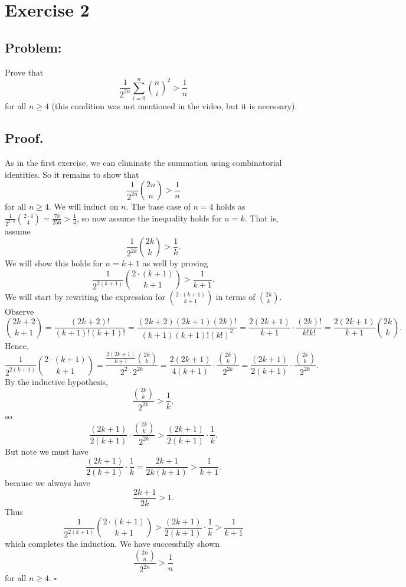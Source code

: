 \documentclass{article}
\begin{document}
\section{Exercise 2}

\subsection{Problem:} Prove that $$\frac{1}{2^{2n}}\sum_{i=0}^{n} \binom{n}{i}^2 >\frac{1}{n}$$ for all $n\ge 4$ (this condition was not mentioned in the video, but it is necessary).

\subsection{Proof.} As in the first exercise, we can eliminate the summation using combinatorial identities. So it remains to show that $$\frac{1}{2^{2n}}\binom{2n}{n} >\frac{1}{n}$$ for all $n\ge 4$. We will induct on $n$. The base case of $n=4$ holds as $\frac{1}{2^{2\cdot 4}}\binom{2\cdot 4}{4}=\frac{70}{256}>\frac{1}{4}$, so now assume the inequality holds for $n=k$. That is, assume $$\frac{1}{2^{2k}}\binom{2k}{k} >\frac{1}{k}.$$ We will show this holds for $n=k+1$ as well by proving
\[
\frac{1}{2^{2(k+1)}} \binom{2\cdot (k+1)}{k+1} > \frac{1}{k+1}.
\]We will start by rewriting the expression for \(\binom{2\cdot(k+1)}{k+1}\) in terms of \(\binom{2k}{k}\). Observe \[
\binom{2k+2}{k+1} = \frac{(2k+2)!}{(k+1)!(k+1)!} = \frac{(2k+2)(2k+1)(2k)!}{(k+1)(k+1)!(k!)^2} = \frac{2(2k+1)}{k+1} \cdot \frac{(2k)!}{k!k!} = \frac{2(2k+1)}{k+1} \binom{2k}{k}.
\]
Hence,
\[
\frac{1}{2^{2(k+1)}}\binom{2\cdot (k+1)}{k+1} = \frac{\frac{2(2k+1)}{k+1} \binom{2k}{k}}{2^{2} \cdot 2^{2k}} = \frac{2(2k+1)}{4(k+1)} \cdot \frac{\binom{2k}{k}}{2^{2k}} = \frac{(2k+1)}{2(k+1)} \cdot \frac{\binom{2k}{k}}{2^{2k}}.
\]
By the inductive hypothesis,
\[
\frac{\binom{2k}{k}}{2^{2k}} > \frac{1}{k},
\]
so
\[
\frac{(2k+1)}{2(k+1)} \cdot \frac{\binom{2k}{k}}{2^{2k}} > \frac{(2k+1)}{2(k+1)} \cdot \frac{1}{k}.
\]
But note we must have
\[
\frac{(2k+1)}{2(k+1)} \cdot \frac{1}{k} = \frac{2k+1}{2k(k+1)}> \frac{1}{k+1}.
\]
because we always have
\[
\frac{2k+1}{2k} > 1.
\]
Thus \[
\frac{1}{2^{2(k+1)}} \binom{2\cdot (k+1)}{k+1} > \frac{(2k+1)}{2(k+1)} \cdot \frac{1}{k}> \frac{1}{k+1}
\] which completes the induction. We have successfully shown
\[
\frac{\binom{2n}{n}}{2^{2n}} > \frac{1}{n}
\] for all \(n \geq 4\). $\square$
\end{document}

